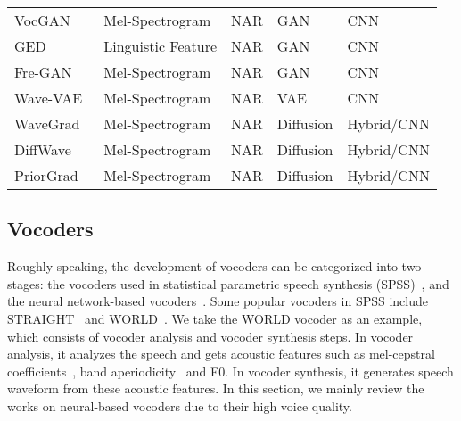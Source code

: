 \documentclass{article}
\begin{document}
\begin{table}[h!]
\begin{tabular}{l | l l l l }
        VocGAN~\cite{yang2020vocgan} & Mel-Spectrogram  & NAR & GAN & CNN \\
        GED~\cite{gritsenko2020spectral} & Linguistic Feature & NAR & GAN & CNN \\
        Fre-GAN~\cite{kim2021fre} & Mel-Spectrogram  & NAR & GAN & CNN \\
        \midrule
        Wave-VAE~\cite{peng2020non} & Mel-Spectrogram  & NAR & VAE & CNN \\
        \midrule
        WaveGrad~\cite{chen2020wavegrad} & Mel-Spectrogram  & NAR & Diffusion & Hybrid/CNN \\
        DiffWave~\cite{kong2020diffwave} & Mel-Spectrogram  & NAR & Diffusion & Hybrid/CNN \\
        PriorGrad~\cite{lee2021priorgrad} & Mel-Spectrogram  & NAR & Diffusion & Hybrid/CNN \\
        \bottomrule
	\end{tabular}
	\vspace{0.3cm}
	\label{tab_vocoder_summary}
\end{table}

\subsection{Vocoders}
\label{sec_funda_voc}
Roughly speaking, the development of vocoders can be categorized into two stages: the vocoders used in statistical parametric speech synthesis (SPSS)~\cite{kawahara2006straight,morise2016world,ai2020neural}, and the neural network-based vocoders~\cite{oord2016wavenet,sotelo2017char2wav,kalchbrenner2018efficient,prenger2019waveglow,kim2019flowavenet}. Some popular vocoders in SPSS include STRAIGHT~\cite{kawahara2006straight} and WORLD~\cite{morise2016world}. We take the WORLD vocoder as an example, which consists of vocoder analysis and vocoder synthesis steps. In vocoder analysis, it analyzes the speech and gets acoustic features such as mel-cepstral coefficients~\cite{fukada1992adaptive}, band aperiodicity~\cite{kawahara1999restructuring,kawahara2001aperiodicity} and F0. In vocoder synthesis, it generates speech waveform from these acoustic features. In this section, we mainly review the works on neural-based vocoders due to their high voice quality. 
\end{document}
